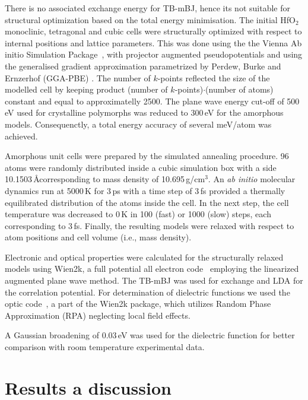 \documentclass[10pt,a4paper,twocolumn]{article}
\begin{document}
There is no associated exchange %
energy for TB-mBJ, hence its not suitable for structural optimization based on the total energy minimisation.
The initial HfO$_2$ monoclinic, tetragonal and cubic cells were structurally optimized with respect to internal positions and lattice parameters.
This was done using the the Vienna Ab initio Simulation Package~\cite{Kresse1996}, with projector augmented pseudopotentials \cite{Kresse1999} and using the generalised gradient approximation parametrized by Perdew, Burke and Ernzerhof (GGA-PBE) \cite{Perdew1996}.
The number of $k$-points reflected the size of the modelled cell by keeping product (number of $k$-points)$\cdot$(number of atoms) constant and equal to approximatelly 2500.
The plane wave energy cut-off of 500\,eV used for crystalline polymorphs was reduced to 300\,eV for the amorphous models.
Consequenctly, a total energy accuracy of several meV/atom was achieved.

Amorphous unit cells were prepared by the simulated annealing procedure.
96 atoms were randomly distributed inside a cubic simulation box with a side 10.1503\,\AA corresponding to mass density of 10.695\,g/cm$^3$.
An \textit{ab initio} molecular dynamics run at 5000\,K for 3\,ps with a time step of 3\,fs provided a thermally equilibrated distribution of the atoms inside the cell.
In the next step, the cell temperature was decreased to 0\,K in 100 (fast) or 1000 (slow) steps, each corresponding to 3\,fs.
Finally, the resulting models were relaxed with respect to atom positions and cell volume (i.e., mass density).


Electronic and optical properties were calculated for the structurally relaxed models using Wien2k, a full potential all electron code~\cite{Blaha2001} employing the linearized augmented plane wave method. The TB-mBJ was used for exchange and LDA for the correlation potential. For determination of dielectric functions we used the optic code~\cite{AmbroschDraxl2006}, a part of the Wien2k package, which utilizes Random Phase Approximation (RPA) neglecting local field effects.

A Gaussian broadening of 0.03\,eV was used for the dielectric function for better comparison with room temperature experimental data.

\section{Results a discussion}
\end{document}
